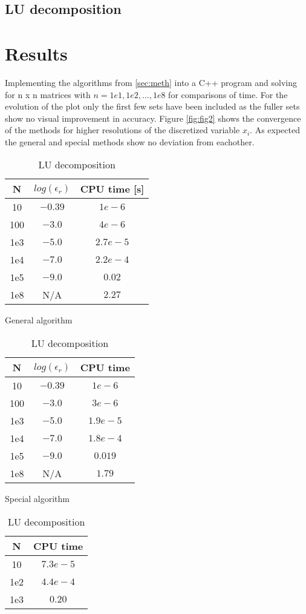 \documentclass[12pt]{article}
\begin{document}
\subsection{LU decomposition}

\section{Results}


Implementing the algorithms from \ref{sec:meth} into a C++ program and solving for n x n matrices with $n = 1e1, 1e2, ... , 1e8$ for comparisons of time. For the evolution of the plot only the first few sets have been included as the fuller sets show no visual improvement in accuracy. Figure \ref{fig:fig2} shows the convergence of the methods for higher resolutions of the discretized variable $x_i$. As expected the general and special methods show no deviation from eachother.  

\begin{table}[h]
  \centering
  \begin{tabular}{ |c |c |c |}
   \hline 
   \hline
   N & $ log(\epsilon_r)$ & CPU time [s]\\
   \hline
   10 & $-0.39$ & $1e-6$\\ 
   100 & $-3.0$ & $4e-6 $\\  
   1e3 & $-5.0$ & $2.7e-5$ \\
   1e4 & $-7.0$ & $2.2e-4$ \\
   1e5 & $-9.0$ & $0.02$ \\
   1e8 & N/A & $2.27$ \\
   \hline
   \hline
  \end{tabular} 
  \caption{General algorithm}

  \begin{tabular}{ |c |c |c |}
   \hline
   \hline
   N & $log(\epsilon_r)$ & CPU time \\
   \hline
   10 & $-0.39$ & $1e-6$\\ 
   100 & $-3.0$ & $3e-6 $\\  
   1e3 & $-5.0$ & $1.9e-5$ \\
   1e4 & $-7.0$ & $1.8e-4$ \\
   1e5 & $-9.0$ & $0.019$ \\
   1e8 & N/A & $1.79$ \\
   \hline
   \hline
  \end{tabular} 
  \caption{Special algorithm}
  
  \begin{tabular}{ |c |c |}
   \hline
   \hline
   N & CPU time \\
   \hline
   10  & $7.3e-5$\\ 
   1e2 & $4.4e-4$\\  
   1e3 & $0.20$\\  
   \hline
   \hline
  \end{tabular} 
  \caption{LU decomposition}
\end{table}
\end{document}
